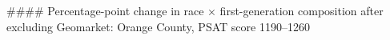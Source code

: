 #### Percentage-point change in race × first-generation composition after excluding Geomarket: Orange County, PSAT score 1190–1260
